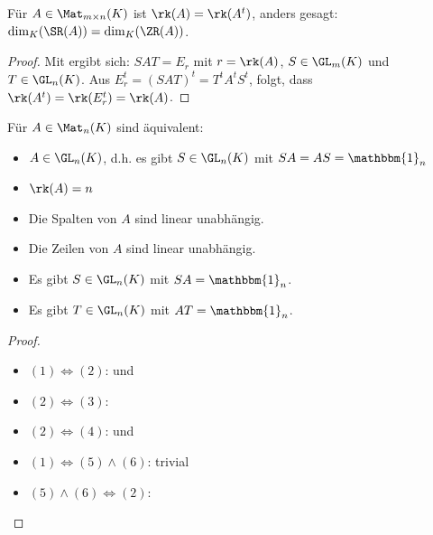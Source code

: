 \begin{proposition}
	Für $A\in \Mat_{m\times n}(K)$ ist $\rk(A)=\rk(A^t)$, anders gesagt: $\dim_K(\SR(A))=\dim_K(\ZR(A))$.
\end{proposition}
\begin{proof}
	Mit  ergibt sich: $SAT=E_r$ mit $r=\rk(A)$, $S\in \GL_m(K)$ und $T\in \GL_n(K)$. Aus $E_r^t=(SAT)^t=T^tA^tS^t$, folgt, 
	dass $\rk(A^t)=\rk(E_r^t)=\rk(A)$.
\end{proof}

\begin{conclusion}
	Für $A\in \Mat_n(K)$ sind äquivalent:
	\begin{itemize}
		\item $A\in \GL_n(K)$, d.h. es gibt $S\in \GL_n(K)$ mit $SA=AS=\mathbbm{1}_n$
		\item $\rk(A)=n$
		\item Die Spalten von $A$ sind linear unabhängig.
		\item Die Zeilen von $A$ sind linear unabhängig.
		\item Es gibt $S\in \GL_n(K)$ mit $SA=\mathbbm{1}_n$.
		\item Es gibt $T\in \GL_n(K)$ mit $AT=\mathbbm{1}_n$.
	\end{itemize}
\end{conclusion}
\begin{proof}
	\begin{itemize}
		\item $(1)\iff (2)$:  und 
		\item $(2)\iff (3)$: 
		\item $(2)\iff (4)$:  und 
		\item $(1)\iff (5)\land (6)$: trivial
		\item $(5)\land (6)\iff (2)$: 
	\end{itemize}
\end{proof}